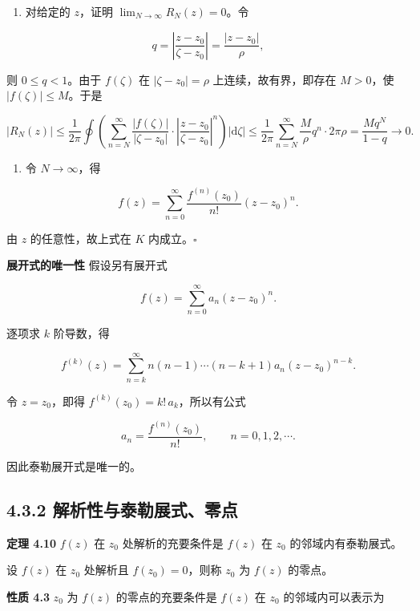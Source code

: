 \begin{enumerate}
\def\labelenumi{\arabic{enumi}.}
\setcounter{enumi}{2}
\tightlist
\item
  对给定的 \(z\)，证明 \(\lim_{N\to\infty}R_N(z)=0\)。令
\end{enumerate}

\[
q=\left|\frac{z-z_0}{\zeta-z_0}\right|=\frac{|z-z_0|}{\rho},
\]

则 \(0\le q<1\)。由于 \(f(\zeta)\) 在 \(|\zeta-z_0|=\rho\)
上连续，故有界，即存在 \(M>0\)，使 \(|f(\zeta)|\le M\)。于是

\[
|R_N(z)|\le\frac{1}{2\pi}\oint\left(\sum_{n=N}^{\infty}\frac{|f(\zeta)|}{|\zeta-z_0|}\cdot\left|\frac{z-z_0}{\zeta-z_0}\right|^n\right)|\mathrm{d}\zeta|
\le\frac{1}{2\pi}\sum_{n=N}^{\infty}\frac{M}{\rho}q^n\cdot 2\pi\rho=\frac{Mq^N}{1-q}\to 0 .
\]

\begin{enumerate}
\def\labelenumi{\arabic{enumi}.}
\setcounter{enumi}{3}
\tightlist
\item
  令 \(N\to\infty\)，得
\end{enumerate}

\[
f(z)=\sum_{n=0}^{\infty}\frac{f^{(n)}(z_0)}{n!}(z-z_0)^n .
\]

由 \(z\) 的任意性，故上式在 \(K\) 内成立。\(\square\)

\textbf{展开式的唯一性} 假设另有展开式

\[
f(z)=\sum_{n=0}^{\infty}a_n(z-z_0)^n .
\]

逐项求 \(k\) 阶导数，得

\[
f^{(k)}(z)=\sum_{n=k}^{\infty}n(n-1)\cdots(n-k+1)a_n(z-z_0)^{n-k}.
\]

令 \(z=z_0\)，即得 \(f^{(k)}(z_0)=k!\,a_k\)，所以有公式

\[
a_n=\frac{f^{(n)}(z_0)}{n!},\qquad n=0,1,2,\cdots .
\]

因此泰勒展开式是唯一的。

\subsection{4.3.2
解析性与泰勒展式、零点}\label{ux89e3ux6790ux6027ux4e0eux6cf0ux52d2ux5c55ux5f0fux96f6ux70b9}

\textbf{定理 4.10} \(f(z)\) 在 \(z_0\) 处解析的充要条件是 \(f(z)\) 在
\(z_0\) 的邻域内有泰勒展式。

设 \(f(z)\) 在 \(z_0\) 处解析且 \(f(z_0)=0\)，则称 \(z_0\) 为 \(f(z)\)
的零点。

\textbf{性质 4.3} \(z_0\) 为 \(f(z)\) 的零点的充要条件是 \(f(z)\) 在
\(z_0\) 的邻域内可以表示为

